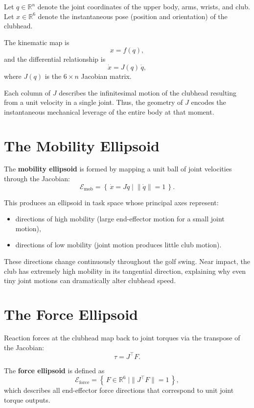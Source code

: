 \documentclass[12pt]{article}
\begin{document}
Let $q \in \mathbb{R}^n$ denote the joint coordinates of the upper body, arms, 
wrists, and club.  
Let $x \in \mathbb{R}^6$ denote the instantaneous pose (position and orientation) 
of the clubhead.

The kinematic map is
\[
    x = f(q) ,
\]
and the differential relationship is
\[
    \dot{x} = J(q)\, \dot{q},
\]
where $J(q)$ is the $6 \times n$ Jacobian matrix.

Each column of $J$ describes the infinitesimal motion of the clubhead resulting 
from a unit velocity in a single joint.  
Thus, the geometry of $J$ encodes the instantaneous mechanical leverage of the 
entire body at that moment.

\section{The Mobility Ellipsoid}

The \textbf{mobility ellipsoid} is formed by mapping a unit ball of joint 
velocities through the Jacobian:
\[
    \mathcal{E}_{\text{mob}} = \left\{\, \dot{x} = J\dot{q} 
    \; \bigg| \; \|\dot{q}\| = 1 \,\right\}.
\]

This produces an ellipsoid in task space whose principal axes represent:
\begin{itemize}
    \item directions of high mobility (large end-effector motion for a small 
    joint motion),
    \item directions of low mobility (joint motion produces little club motion).
\end{itemize}

These directions change continuously throughout the golf swing.  
Near impact, the club has extremely high mobility in its tangential direction, 
explaining why even tiny joint motions can dramatically alter clubhead speed.

\section{The Force Ellipsoid}

Reaction forces at the clubhead map back to joint torques via the transpose of 
the Jacobian:
\[
    \tau = J^\top F.
\]

The \textbf{force ellipsoid} is defined as
\[
    \mathcal{E}_{\text{force}} = 
    \left\{\, F \in \mathbb{R}^6 \; \bigg|
    \|J^\top F\| = 1 \,\right\},
\]
which describes all end-effector force directions that correspond to unit joint 
torque outputs.
\end{document}
